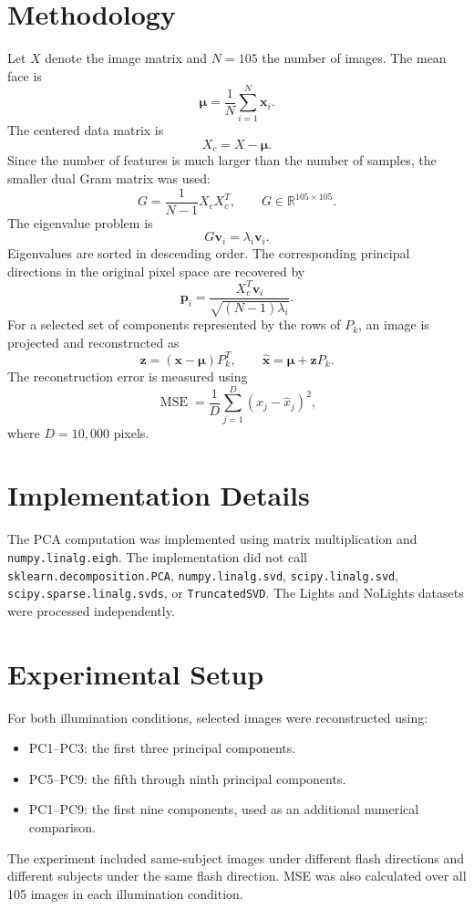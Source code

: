 \documentclass[12pt,a4paper]{report}
\begin{document}
\section{Methodology}
Let $X$ denote the image matrix and $N=105$ the number of images. The mean face is
\[
\boldsymbol{\mu}=\frac{1}{N}\sum_{i=1}^{N}\mathbf{x}_i.
\]
The centered data matrix is
\[
X_c=X-\boldsymbol{\mu}.
\]
Since the number of features is much larger than the number of samples, the smaller dual Gram matrix was used:
\[
G=\frac{1}{N-1}X_cX_c^T,\qquad G\in\mathbb{R}^{105\times105}.
\]
The eigenvalue problem is
\[
G\mathbf{v}_i=\lambda_i\mathbf{v}_i.
\]
Eigenvalues are sorted in descending order. The corresponding principal directions in the original pixel space are recovered by
\[
\mathbf{p}_i=
\frac{X_c^T\mathbf{v}_i}
{\sqrt{(N-1)\lambda_i}}.
\]
For a selected set of components represented by the rows of $P_k$, an image is projected and reconstructed as
\[
\mathbf{z}=(\mathbf{x}-\boldsymbol{\mu})P_k^T,
\qquad
\hat{\mathbf{x}}=\boldsymbol{\mu}+\mathbf{z}P_k.
\]
The reconstruction error is measured using
\[
\operatorname{MSE}=\frac{1}{D}\sum_{j=1}^{D}(x_j-\hat{x}_j)^2,
\]
where $D=10,000$ pixels.

\section{Implementation Details}
The PCA computation was implemented using matrix multiplication and \texttt{numpy.linalg.eigh}. The implementation did not call \texttt{sklearn.decomposition.PCA}, \texttt{numpy.linalg.svd}, \texttt{scipy.linalg.svd}, \texttt{scipy.sparse.linalg.svds}, or \texttt{TruncatedSVD}. The Lights and NoLights datasets were processed independently.

\section{Experimental Setup}
For both illumination conditions, selected images were reconstructed using:
\begin{itemize}[nosep]
    \item PC1--PC3: the first three principal components.
    \item PC5--PC9: the fifth through ninth principal components.
    \item PC1--PC9: the first nine components, used as an additional numerical comparison.
\end{itemize}
The experiment included same-subject images under different flash directions and different subjects under the same flash direction. MSE was also calculated over all 105 images in each illumination condition.
\end{document}
